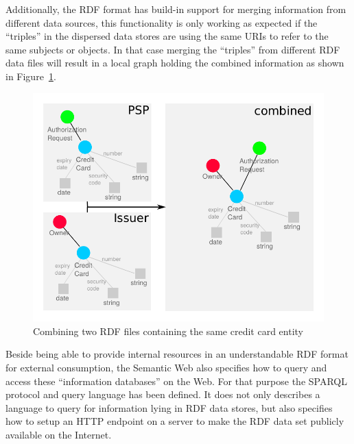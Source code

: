 Additionally, the \gls{RDF} format has build-in support for merging information from different data sources, this functionality is only working as expected if the ``triples'' in the dispersed data stores are using the same \gls{URI}s to refer to the same subjects or objects. In that case merging the ``triples'' from different \gls{RDF} data files will result in a local graph holding the combined information as shown in Figure~\ref{fig:images_combine_rdf_graph}. \@

\begin{figure}[H]
	\centering
		\includegraphics[width=0.9\columnwidth]{images/combine_rdf_graph.pdf}
	\caption{Combining two \gls{RDF} files containing the same credit card entity}
\label{fig:images_combine_rdf_graph}
\end{figure}

Beside being able to provide internal resources in an understandable \gls{RDF} format for external consumption, the Semantic Web also specifies how to query and access these ``information databases'' on the Web. For that purpose the \gls{SPARQL} protocol and query language has been defined. It does not only describes a language to query for information lying in \gls{RDF} data stores, but also specifies how to setup an \gls{HTTP} endpoint on a server to make the \gls{RDF} data set publicly available on the Internet. \\

